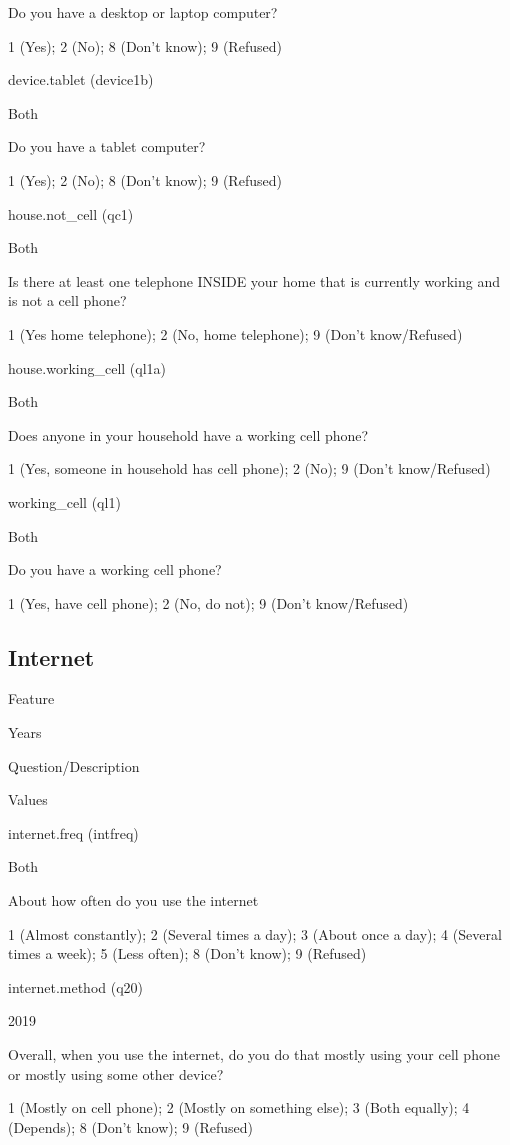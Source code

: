 \documentclass[]{book}
\begin{document}
Do you have a desktop or laptop computer?

1 (Yes); 2 (No); 8 (Don't know); 9 (Refused)

device.tablet (device1b)

Both

Do you have a tablet computer?

1 (Yes); 2 (No); 8 (Don't know); 9 (Refused)

house.not\_cell (qc1)

Both

Is there at least one telephone INSIDE your home that is currently
working and is not a cell phone?

1 (Yes home telephone); 2 (No, home telephone); 9 (Don't know/Refused)

house.working\_cell (ql1a)

Both

Does anyone in your household have a working cell phone?

1 (Yes, someone in household has cell phone); 2 (No); 9 (Don't
know/Refused)

working\_cell (ql1)

Both

Do you have a working cell phone?

1 (Yes, have cell phone); 2 (No, do not); 9 (Don't know/Refused)

\subsection*{Internet}\label{internet}

Feature

Years

Question/Description

Values

internet.freq (intfreq)

Both

About how often do you use the internet

1 (Almost constantly); 2 (Several times a day); 3 (About once a day); 4
(Several times a week); 5 (Less often); 8 (Don't know); 9 (Refused)

internet.method (q20)

2019

Overall, when you use the internet, do you do that mostly using your
cell phone or mostly using some other device?

1 (Mostly on cell phone); 2 (Mostly on something else); 3 (Both
equally); 4 (Depends); 8 (Don't know); 9 (Refused)
\end{document}

